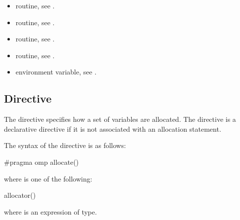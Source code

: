 \crossreferences
\begin{itemize}
\item {} routine, see .

\item {} routine, see .

\item {} routine, 
see .

\item {} routine, 
see .

\item {} environment variable, see .
\end{itemize}



\subsection{ Directive}
\label{subsec:allocate Directive}
\summary

The  directive specifies how a set of variables are allocated. 
The  directive is a declarative directive if it is not associated 
with an allocation statement.

\syntax
\begin{ccppspecific}
The syntax of the  directive is as follows:

\begin{ompcPragma}
#pragma omp allocate() 
\end{ompcPragma}

where  is one of the following:

\begin{indentedcodelist}
allocator()
\end{indentedcodelist}

where  is an expression of  type.

\end{ccppspecific}
\medskip

